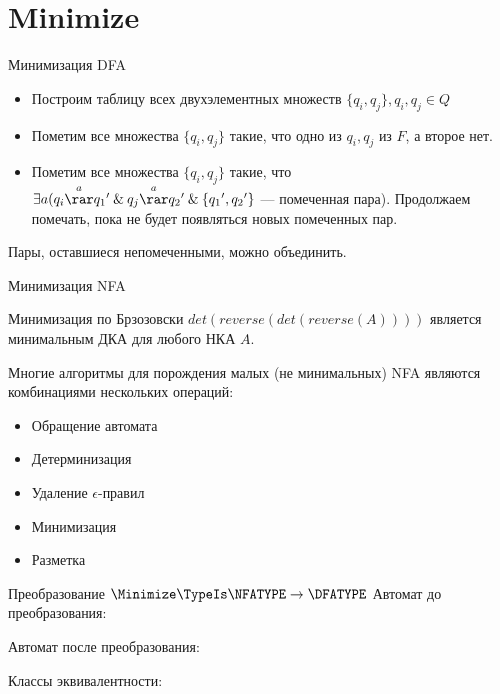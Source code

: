 \section{Minimize}
\begin{frame}{Минимизация DFA}
    \begin{itemize}
        \item Построим таблицу всех двухэлементных множеств $\{q_i, q_j\}, q_i, q_j \in Q$
        \item Пометим все множества $\{q_i, q_j\}$ такие, что одно из $q_i, q_j$ из $F$, а второе нет.
        \item Пометим все множества $\{q_i, q_j\}$ такие, что $\exists a({q_i}\overset{a}{\rar}{q_1}' \: \& \: {q_j}\overset{a}{\rar}{q_2}' \: \& \: \{{q_1}', {q_2}'\}$ — помеченная пара). Продолжаем помечать, пока не будет появляться новых помеченных пар.
    \end{itemize}
    Пары, оставшиеся непомеченными, можно объединить.
\end{frame}
\begin{frame}{Минимизация NFA}
    \begin{block}{Минимизация по Брзозовски}
        $det(reverse(det(reverse(A))))$ является минимальным ДКА для любого НКА $A$.
    \end{block}
    Многие алгоритмы для порождения малых (не минимальных) NFA являются комбинациями нескольких операций:
    \begin{itemize}
        \item Обращение автомата
        \item Детерминизация
        \item Удаление $\epsilon$-правил
        \item Минимизация
        \item Разметка
    \end{itemize}
\end{frame}
\begin{frame}{Преобразование $\Minimize\TypeIs\NFATYPE\to\DFATYPE$}
	Автомат до преобразования:


	Автомат после преобразования:%


	Классы эквивалентности:




\end{frame}
